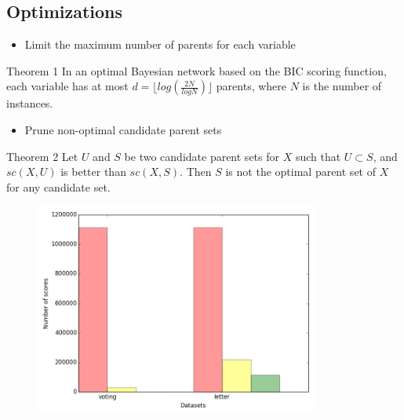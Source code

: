 \subsection{Optimizations}

\begin{frame}
	\begin{itemize}
		\item Limit the maximum number of parents for each variable
	\end{itemize}
	\begin{block}{Theorem 1}
		In an optimal Bayesian network based on the BIC scoring function, each
variable has at most $d = \lfloor log( \frac{ 2N }{ log N } ) \rfloor$ parents, where $N$ is the number of instances.
	\end{block}
	\pause
	\begin{itemize}
		\item Prune non-optimal candidate parent sets
	\end{itemize}
	\begin{block}{Theorem 2}
		Let $U$ and $S$ be two candidate parent sets for $X$ such that $U \subset S$, and ${sc}( X , U )$ is \alert{better} than ${sc}( X , S )$. Then $S$ is not the optimal parent set of $X$ for any candidate set.
	\end{block}
\end{frame}

\begin{frame}
	
\end{frame}

\begin{frame}
	\begin{figure}
		\centering
		\includegraphics[height=7cm]{images/num_scores}
	\end{figure}
\end{frame}

\begin{frame}
	
\end{frame}